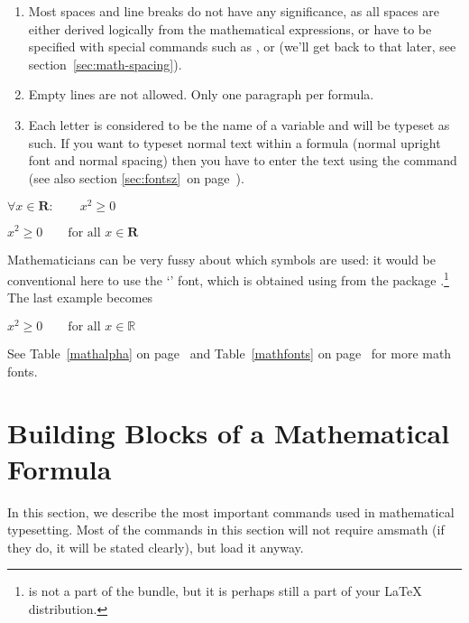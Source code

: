 \begin{enumerate}

\item {} Most spaces and line breaks do not have any significance, as all spaces
are either derived logically from the mathematical expressions, or
have to be specified with special commands such as \ci{,},  or
 (we'll get back to that later, see section~\ref{sec:math-spacing}).
 
\item Empty lines are not allowed. Only one paragraph per formula.

\item Each letter is considered to be the name of a variable and will be
typeset as such. If you want to typeset normal text within a formula
(normal upright font and normal spacing) then you have to enter the
text using the  command (see also section \ref{sec:fontsz}~on
page~\pageref{sec:fontsz}).

\end{enumerate}
\begin{example}
$\forall x \in \mathbf{R}\colon
 \qquad x^{2} \geq 0$
\end{example}
\begin{example}
$x^{2} \geq 0\qquad
 \text{for all }x\in\mathbf{R}$
\end{example}
 
Mathematicians can be very fussy about which symbols are used:
it would be conventional here to use the `' font,
 which is obtained using  from the
package .\footnote{ is not a part
  of the  bundle, but it is perhaps still a part of your \LaTeX{}
  distribution.}
\ifx\mathbb\undefined\else
The last example becomes
\begin{example}
$x^{2} \geq 0\qquad
 \text{for all } x 
 \in \mathbb{R}$
\end{example}
\fi
See Table~\ref{mathalpha} on page~\pageref{mathalpha} and
Table~\ref{mathfonts} on page~\pageref{mathfonts} for more math fonts.



\section{Building Blocks of a Mathematical Formula}

In this section, we describe the most important commands used in mathematical
typesetting. Most of the commands in this section will not require
\textsf{amsmath} (if they do, it will be stated clearly), but load it anyway.


